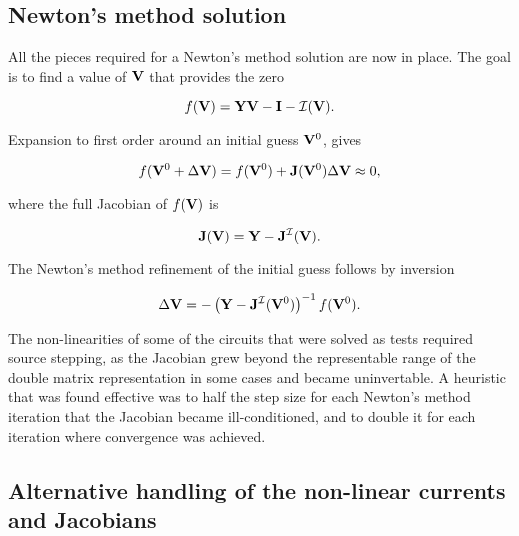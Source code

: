 \documentclass[12pt,journal,compsoc]{../ieeepaper/IEEEtran}
\begin{document}
\subsection{Newton's method solution}

All the pieces required for a Newton's method solution are now in place.  The goal is to find a value of \( \mathbf{V} \) that provides the zero

\begin{dmath}\label{eqn:ece1254projectReport:1220}
f(\BV) = \BY \BV - \BI - \mathcal{I}(\BV).
\end{dmath}

Expansion to first order around an initial guess \( \mathbf{V}^0 \), gives

\begin{dmath}\label{eqn:ece1254projectReport:1240}
f( \BV^0 + \Delta \BV ) = f(\BV^0) + \BJ(\BV^0) \Delta \BV \approx 0,
\end{dmath}

where the full Jacobian of \( f(\mathbf{V}) \) is

\begin{dmath}\label{eqn:ece1254projectReport:1260}
\BJ(\BV) = \BY - \BJ^{\mathcal{I}}(\BV).
\end{dmath}

The Newton's method refinement of the initial guess follows by inversion

\begin{dmath}\label{eqn:ece1254projectReport:1280}
\Delta \BV = -\lr{ \BY - \BJ^{\mathcal{I}}(\BV^0) }^{-1} f(\BV^0).
\end{dmath}

The non-linearities of some of the circuits that were solved as tests required source stepping, as the Jacobian grew beyond the representable range of the double matrix representation in some cases and became uninvertable.  A heuristic that was found effective was to half the step size for each Newton's method iteration that the Jacobian became ill-conditioned, and to double it for each iteration where convergence was achieved.

\subsection{Alternative handling of the non-linear currents and Jacobians}
\end{document}
